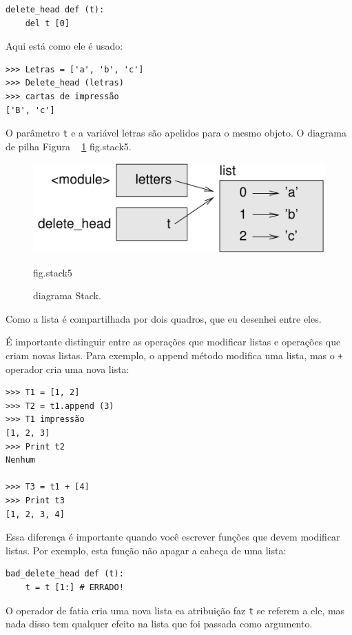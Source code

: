 \documentclass[10pt]{book}
\begin{document}
\begin{verbatim}
delete_head def (t):
    del t [0]
\end{verbatim}
%
Aqui está como ele é usado:

\begin{verbatim}
>>> Letras = ['a', 'b', 'c']
>>> Delete_head (letras)
>>> cartas de impressão
['B', 'c']
\end{verbatim}
%
O parâmetro {\tt t} e {a variável letras \tt} são
apelidos para o mesmo objeto. O diagrama de pilha
Figura ~ \ref {} fig.stack5.

\begin{figure}
\centerline
{\includegraphics[scale = 0.8] {figs/stack5.pdf}}
\caption{diagrama Stack.}
\label{} fig.stack5
\end{figure}


Como a lista é compartilhada por dois quadros, que eu desenhei
entre eles.

É importante distinguir entre as operações que
modificar listas e operações que criam novas listas. Para
exemplo, o {\tt} append método modifica uma lista, mas o
{\tt +} operador cria uma nova lista:

\begin{verbatim}
>>> T1 = [1, 2]
>>> T2 = t1.append (3)
>>> T1 impressão
[1, 2, 3]
>>> Print t2
Nenhum

>>> T3 = t1 + [4]
>>> Print t3
[1, 2, 3, 4]
\end{verbatim}

Essa diferença é importante quando você escrever funções que
devem modificar listas. Por exemplo, esta função
{\Em não apagar} a cabeça de uma lista:

\begin{verbatim}
bad_delete_head def (t):
    t = t [1:] # ERRADO!
\end{verbatim}

O operador de fatia cria uma nova lista ea atribuição
faz {\tt t} se referem a ele, mas nada disso tem qualquer efeito
na lista que foi passada como argumento.
\end{document}
